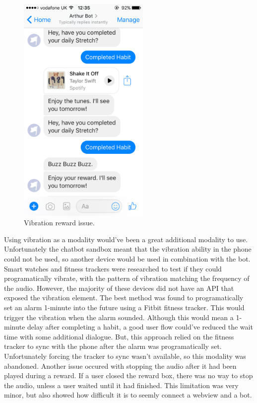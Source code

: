 \begin{figure}[H]
    \centering
    \includegraphics[width=2.5in]{../resources/design/vibration-reward.png}
    \caption{Vibration reward issue.}
    \label{fig:vibration_reward_issue}
\end{figure}


Using vibration as a modality would've been a great additional modality to use.
Unfortunately the chatbot sandbox meant that the vibration ability in the phone could not be used, so another device would be used in combination with the bot.
Smart watches and fitness trackers were researched to test if they could programatically vibrate, with the pattern of vibration matching the frequency of the audio.
However, the majority of these devices did not have an API that exposed the vibration element. The best method was found to programatically set an alarm 1-minute into the future using a Fitbit fitness tracker.
This would trigger the vibration when the alarm sounded.
Although this would mean a 1-minute delay after completing a habit, a good user flow could've reduced the wait time with some additional dialogue.
But, this approach relied on the fitness tracker to sync with the phone after the alarm was programatically set. Unfortunately forcing the tracker to sync wasn't available, so this modality was abandoned.\newline
\newline
Another issue occured with stopping the audio after it had been played during a reward. If a user closed the reward box, there was no way to stop the audio, unless a user waited until it had finished. This limitation was very minor, but also showed how difficult it is to seemly connect a webview and a bot.


